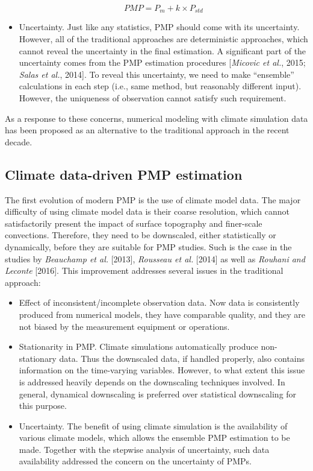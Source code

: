 \begin{itemize}
\begin{equation}
	PMP = P_{m} + k \times P_{std}
	\label{eq:1-2}
\end{equation}

\item Uncertainty. Just like any statistics, PMP should come with its uncertainty. However, all of the traditional approaches are deterministic approaches, which cannot reveal the uncertainty in the final estimation. A significant part of the uncertainty comes from the PMP estimation procedures [\textit{Micovic et al.}, 2015; \textit{Salas et al.}, 2014]. To reveal this uncertainty, we need to make ``ensemble'' calculations in each step (i.e., same method, but reasonably different input). However, the uniqueness of observation cannot satisfy such requirement.
\end{itemize}

As a response to these concerns, numerical modeling with climate simulation data has been proposed as an alternative to the traditional approach in the recent decade.

\subsection{Climate data-driven PMP estimation}

The first evolution of modern PMP is the use of climate model data. The major difficulty of using climate model data is their coarse resolution, which cannot satisfactorily present the impact of surface topography and finer-scale convections. Therefore, they need to be downscaled, either statistically or dynamically, before they are suitable for PMP studies. Such is the case in the studies by \textit{Beauchamp et al.} [2013], \textit{Rousseau et al.} [2014] as well as \textit{Rouhani and Leconte} [2016]. This improvement addresses several issues in the traditional approach:

\begin{itemize}
\item Effect of inconsistent/incomplete observation data. Now data is consistently produced from numerical models, they have comparable quality, and they are not biased by the measurement equipment or operations.

\item Stationarity in PMP. Climate simulations automatically produce non-stationary data. Thus the downscaled data, if handled properly, also contains information on the time-varying variables. However, to what extent this issue is addressed heavily depends on the downscaling techniques involved. In general, dynamical downscaling is preferred over statistical downscaling for this purpose.

\item Uncertainty. The benefit of using climate simulation is the availability of various climate models, which allows the ensemble PMP estimation to be made. Together with the stepwise analysis of uncertainty, such data availability addressed the concern on the uncertainty of PMPs.
\end{itemize}

